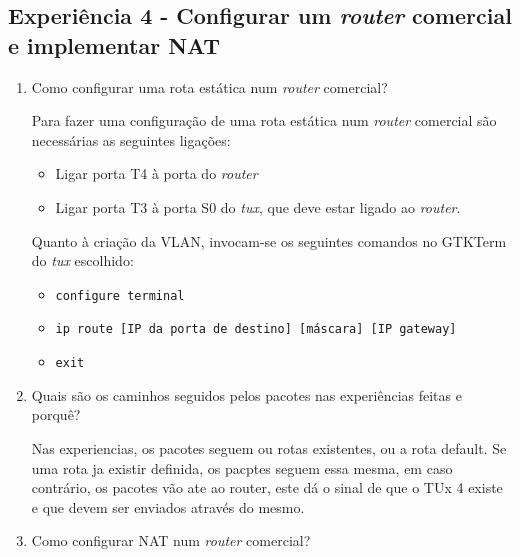 \documentclass{article}
\begin{document}
\subsection{Experiência 4 - Configurar um \textit{router} comercial e implementar NAT}
\begin{enumerate}
\item Como configurar uma rota estática num \textit{router} comercial?

Para fazer uma configuração de uma rota estática num \textit{router} comercial são necessárias as seguintes ligações:
\begin{itemize}
    \item Ligar porta T4 à porta do \textit{router}
    \item Ligar porta T3 à porta S0 do \textit{tux}, que deve estar ligado ao \textit{router}.
\end{itemize}
Quanto à criação da VLAN, invocam-se os seguintes comandos no GTKTerm do \textit{tux} escolhido:
\begin{itemize}
    \item \texttt{configure terminal}
    \item \texttt{ip route [IP da porta de destino] [máscara] [IP gateway]}
    \item \texttt{exit}
\end{itemize}


\item Quais são os caminhos seguidos pelos pacotes nas experiências feitas e porquê?

Nas experiencias, os pacotes seguem ou rotas existentes, ou a rota default.
Se uma rota ja existir definida, os pacptes seguem essa mesma, em caso contrário, os pacotes vão ate ao router, este dá o sinal de que o TUx 4 existe e que devem ser enviados através do mesmo.

\item Como configurar NAT num \textit{router} comercial?


\end{enumerate}
\end{document}
